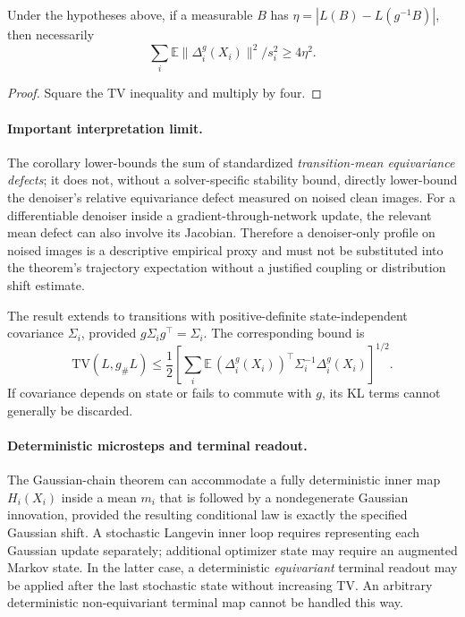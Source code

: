 \begin{corollary}
\label{cor:th1-necessary-defect}
Under the hypotheses above, if a measurable \(B\) has
\(\eta=|L(B)-L(g^{-1}B)|\), then necessarily
\[
 \sum_i \mathbb E\|\Delta_i^g(X_i)\|^2/s_i^2
 \ge 4\eta^2.
\]
\end{corollary}
\begin{proof}
Square the TV inequality and multiply by four.
\end{proof}

\paragraph{Important interpretation limit.}
The corollary lower-bounds the sum of standardized
\emph{transition-mean equivariance defects}; it does not, without
a solver-specific stability bound, directly lower-bound the
denoiser's relative equivariance defect measured on noised clean
images. For a differentiable denoiser inside a gradient-through-network
update, the relevant mean defect can also involve its Jacobian.
Therefore a denoiser-only profile on noised images is a descriptive
empirical proxy and must not be substituted into the theorem's
trajectory expectation without a justified coupling or distribution
shift estimate.

\begin{remark}
\label{rem:th1-covariance}
The result extends to transitions with positive-definite
state-independent covariance \(\Sigma_i\), provided
\(g\Sigma_i g^\top=\Sigma_i\). The corresponding bound is
\[
 \mathrm{TV}(L,g_\#L)
 \le\frac12\left[
 \sum_i\mathbb E\,
 (\Delta_i^g(X_i))^\top\Sigma_i^{-1}\Delta_i^g(X_i)
 \right]^{1/2}.
\]
If covariance depends on state or fails to commute with \(g\),
its KL terms cannot generally be discarded.
\end{remark}

\paragraph{Deterministic microsteps and terminal readout.}
The Gaussian-chain theorem can accommodate a fully deterministic
inner map \(H_i(X_i)\) inside a mean \(m_i\) that is followed by a
nondegenerate Gaussian innovation, provided the resulting conditional
law is exactly the specified Gaussian shift. A stochastic Langevin
inner loop requires representing each Gaussian update separately;
additional optimizer state may require an augmented Markov state.
In the latter case, a deterministic \emph{equivariant} terminal
readout may be applied after the last stochastic state without
increasing TV. An arbitrary deterministic non-equivariant terminal
map cannot be handled this way.

